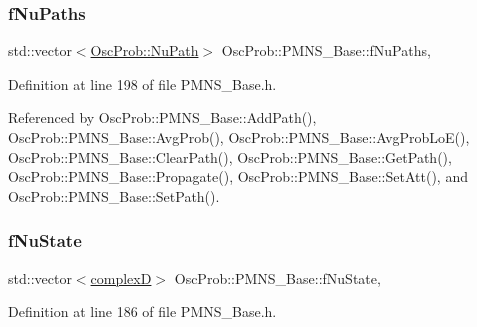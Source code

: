 \mbox{\label{classOscProb_1_1PMNS__Base_a69db9d57e12fc7cbe0431bc6c18fac93}} 
\subsubsection{\texorpdfstring{f\+Nu\+Paths}{fNuPaths}}
{\footnotesize\ttfamily std\+::vector$<$\hyperlink{structOscProb_1_1NuPath}{Osc\+Prob\+::\+Nu\+Path}$>$ Osc\+Prob\+::\+P\+M\+N\+S\+\_\+\+Base\+::f\+Nu\+Paths\hspace{0.3cm}{\ttfamily [protected]}, {\ttfamily [inherited]}}



Definition at line 198 of file P\+M\+N\+S\+\_\+\+Base.\+h.



Referenced by Osc\+Prob\+::\+P\+M\+N\+S\+\_\+\+Base\+::\+Add\+Path(), Osc\+Prob\+::\+P\+M\+N\+S\+\_\+\+Base\+::\+Avg\+Prob(), Osc\+Prob\+::\+P\+M\+N\+S\+\_\+\+Base\+::\+Avg\+Prob\+Lo\+E(), Osc\+Prob\+::\+P\+M\+N\+S\+\_\+\+Base\+::\+Clear\+Path(), Osc\+Prob\+::\+P\+M\+N\+S\+\_\+\+Base\+::\+Get\+Path(), Osc\+Prob\+::\+P\+M\+N\+S\+\_\+\+Base\+::\+Propagate(), Osc\+Prob\+::\+P\+M\+N\+S\+\_\+\+Base\+::\+Set\+Att(), and Osc\+Prob\+::\+P\+M\+N\+S\+\_\+\+Base\+::\+Set\+Path().

\mbox{\label{classOscProb_1_1PMNS__Base_abf99f2339e3ee989600740b5d88063e8}} 
\subsubsection{\texorpdfstring{f\+Nu\+State}{fNuState}}
{\footnotesize\ttfamily std\+::vector$<$\hyperlink{EigenPoint_8h_a67ca8e107e20610c3fff78d5e726ece0}{complexD}$>$ Osc\+Prob\+::\+P\+M\+N\+S\+\_\+\+Base\+::f\+Nu\+State\hspace{0.3cm}{\ttfamily [protected]}, {\ttfamily [inherited]}}



Definition at line 186 of file P\+M\+N\+S\+\_\+\+Base.\+h.



